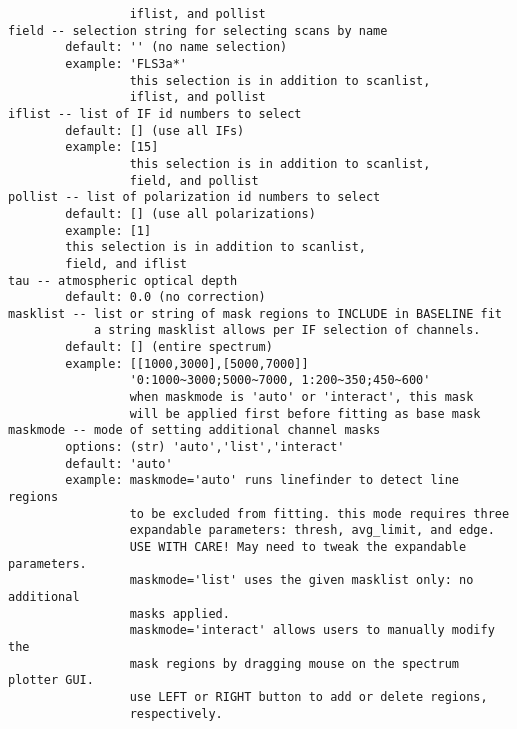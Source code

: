 \begin{verbatim}
                 iflist, and pollist
field -- selection string for selecting scans by name
        default: '' (no name selection)
        example: 'FLS3a*'
                 this selection is in addition to scanlist,
                 iflist, and pollist
iflist -- list of IF id numbers to select
        default: [] (use all IFs)
        example: [15]
                 this selection is in addition to scanlist,
                 field, and pollist
pollist -- list of polarization id numbers to select
        default: [] (use all polarizations)
        example: [1]
        this selection is in addition to scanlist,
        field, and iflist
tau -- atmospheric optical depth
        default: 0.0 (no correction)
masklist -- list or string of mask regions to INCLUDE in BASELINE fit
            a string masklist allows per IF selection of channels.
        default: [] (entire spectrum)
        example: [[1000,3000],[5000,7000]]
                 '0:1000~3000;5000~7000, 1:200~350;450~600'
                 when maskmode is 'auto' or 'interact', this mask 
                 will be applied first before fitting as base mask
maskmode -- mode of setting additional channel masks
        options: (str) 'auto','list','interact'
        default: 'auto'
        example: maskmode='auto' runs linefinder to detect line regions 
                 to be excluded from fitting. this mode requires three 
                 expandable parameters: thresh, avg_limit, and edge.
                 USE WITH CARE! May need to tweak the expandable parameters.
                 maskmode='list' uses the given masklist only: no additional 
                 masks applied.
                 maskmode='interact' allows users to manually modify the 
                 mask regions by dragging mouse on the spectrum plotter GUI.
                 use LEFT or RIGHT button to add or delete regions, 
                 respectively.
       

\end{verbatim}
